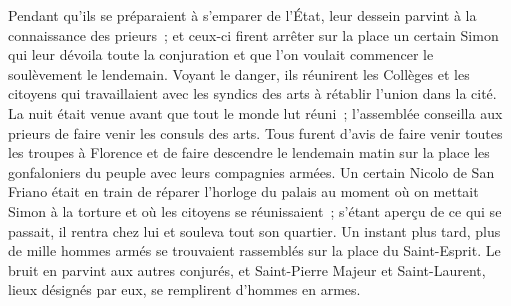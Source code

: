 \documentclass[french,twoside]{book} %
\newenvironment{quoteblock}%
  {\begin{quoting}}
  {\end{quoting}}
\newenvironment{quotebar}{%
    \def\FrameCommand{{\color{rubric!10!}\vrule width 0.5em} \hspace{0.9em}}%
    \def\OuterFrameSep{\itemsep} %
    \MakeFramed {\advance\hsize-\width \FrameRestore}
  }%
  {%
    \endMakeFramed
  }
\renewenvironment{quoteblock}%
  {%
    \savenotes
    \setstretch{0.9}
    \normalfont
    \begin{quotebar}
  }
  {%
    \end{quotebar}
    \spewnotes
  }
\begin{document}
\begin{quoteblock}
 Pendant qu'ils se préparaient à s'emparer de l'État, leur dessein parvint à la connaissance des prieurs ; et ceux-ci firent arrêter sur la place un certain Simon qui leur dévoila toute la conjuration et que l'on voulait commencer le soulèvement le lendemain. Voyant le danger, ils réunirent les Collèges et les citoyens qui travaillaient avec les syndics des arts à rétablir l'union dans la cité. La nuit était venue avant que tout le monde lut réuni ; l'assemblée con­seilla aux prieurs de faire venir les consuls des arts. Tous furent d'avis de faire venir toutes les troupes à Florence et de faire descendre le lendemain matin sur la place les gonfaloniers du peuple avec leurs compagnies armées. Un certain Nicolo de San Friano était en train de réparer l'horloge du palais au moment où on mettait Simon à la torture et où les citoyens se réunissaient ; s'étant aperçu de ce qui se passait, il rentra chez lui et souleva tout son quar­tier. Un instant plus tard, plus de mille hommes armés se trouvaient rassem­blés sur la place du Saint-Esprit. Le bruit en parvint aux autres conjurés, et Saint-Pierre Majeur et Saint-Laurent, lieux désignés par eux, se remplirent d'hommes en armes.\par

\end{quoteblock}
\end{document}
